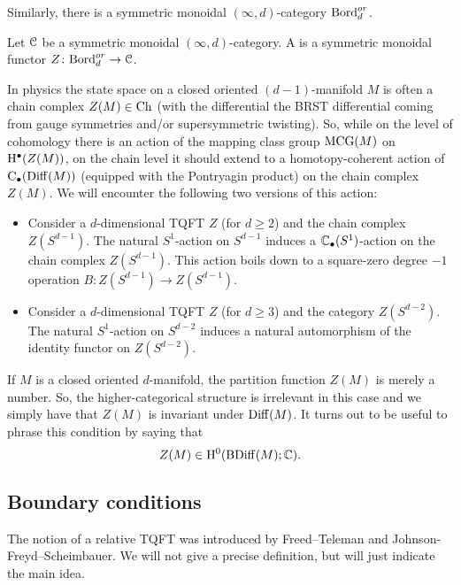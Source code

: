 Similarly, there is a symmetric monoidal $(\infty, d)$-category $\mathrm{Bord}^{or}_d$.

\begin{defn}
	Let $\mathcal{C}$ be a symmetric monoidal $(\infty, d)$-category. A  is a symmetric monoidal functor $Z\colon \mathrm{Bord}^{or}_d\rightarrow \mathcal{C}$.
\end{defn}

In physics the state space on a closed oriented $(d-1)$-manifold $M$ is often a chain complex $Z(M)\in\mathrm{Ch}$ (with the differential the BRST differential coming from gauge symmetries and/or supersymmetric twisting). So, while on the level of cohomology there is an action of the mapping class group $\mathrm{MCG}(M)$ on $\mathrm{H}^\bullet(Z(M))$, on the chain level it should extend to a homotopy-coherent action of $\mathrm{C}_\bullet(\mathrm{Diff}(M))$ (equipped with the Pontryagin product) on the chain complex $Z(M)$. We will encounter the following two versions of this action:
\begin{itemize}
	\item Consider a $d$-dimensional TQFT $Z$ (for $d\geq 2$) and the chain complex $Z(S^{d-1})$. The natural $S^1$-action on $S^{d-1}$ induces a $\mathbb{C}_\bullet(S^1)$-action on the chain complex $Z(S^{d-1})$. This action boils down to a square-zero degree $-1$ operation $B\colon Z(S^{d-1})\rightarrow Z(S^{d-1})$.
	
	\item Consider a $d$-dimensional TQFT $Z$ (for $d\geq 3$) and the category $Z(S^{d-2})$. The natural $S^1$-action on $S^{d-2}$ induces a natural automorphism of the identity functor on $Z(S^{d-2})$.
\end{itemize}

If $M$ is a closed oriented $d$-manifold, the partition function $Z(M)$ is merely a number. So, the higher-categorical structure is irrelevant in this case and we simply have that $Z(M)$ is invariant under $\mathrm{Diff}(M)$. It turns out to be useful to phrase this condition by saying that
\[Z(M)\in\mathrm{H}^0(\mathrm{B}\mathrm{Diff}(M); \mathbb{C}).\]

\subsection{Boundary conditions}

The notion of a relative TQFT was introduced by Freed--Teleman and Johnson-Freyd--Scheimbauer. We will not give a precise definition, but will just indicate the main idea.

